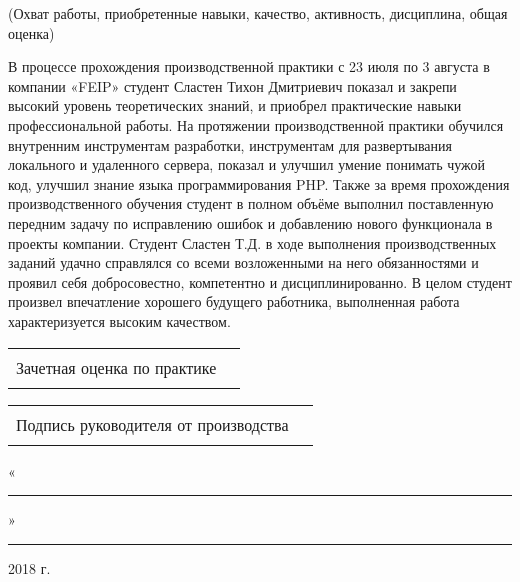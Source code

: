 \begin{center}
    \footnotesize{(Охват работы, приобретенные навыки, качество, активность, дисциплина, общая оценка)}
\end{center}\bigbreak
В процессе прохождения производственной практики с 23 июля по 3 августа в компании «FEIP» студент 
Сластен Тихон Дмитриевич показал и закрепи высокий уровень теоретических знаний, и приобрел практические 
навыки профессиональной работы.\bigbreak
На протяжении производственной практики обучился внутренним инструментам разработки, инструментам для 
развертывания локального и удаленного сервера, показал и улучшил умение понимать чужой код, улучшил знание 
языка программирования PHP.\bigbreak
Также за время прохождения производственного обучения студент в полном объёме выполнил поставленную передним 
задачу по исправлению ошибок и добавлению нового функционала в проекты компании.\bigbreak
Студент Сластен Т.Д. в ходе выполнения производственных заданий удачно справлялся со всеми возложенными на 
него обязанностями и проявил себя добросовестно, компетентно и дисциплинированно.\bigbreak
В целом студент произвел впечатление хорошего будущего работника, выполненная работа характеризуется высоким 
качеством.\bigbreak

\begin{tabular*}{\textwidth}{cc}
    Зачетная оценка по практике & \rule{7cm}{0.01cm}
\end{tabular*}\bigbreak

\begin{tabular*}{\textwidth}{cc}
    Подпись руководителя от производства & \rule{4.8cm}{0.01cm}
\end{tabular*}\bigbreak

«\rule{1cm}{0.01cm}» \rule{4cm}{0.01cm} 2018 г.


